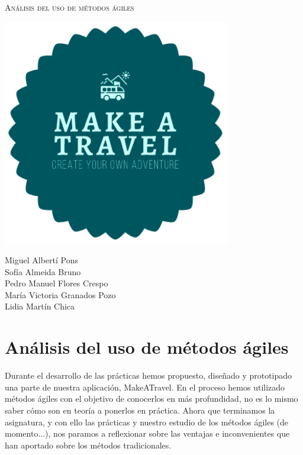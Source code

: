 \documentclass[11pt]{article}
\begin{document}
\begin{titlepage}
\centering
\vspace{4.5cm}
{\scshape\LARGE Análisis del uso de métodos ágiles\par}
\vspace{1.5cm}

\includegraphics[width=10cm] {Logo}

\vspace{3cm}
{\scshape\large \par}
\vspace{1cm}

{Miguel Albertí Pons\\
Sofía Almeida Bruno\\
Pedro Manuel Flores Crespo\\
María Victoria Granados Pozo\\
Lidia Martín Chica
\par}

\end{titlepage}

\newpage
\section{Análisis del uso de métodos ágiles}
Durante el desarrollo de las prácticas hemos propuesto, diseñado y prototipado una parte de nuestra aplicación, MakeATravel. En el proceso hemos utilizado métodos ágiles con el objetivo de conocerlos en más profundidad, no es lo mismo saber cómo son en teoría a ponerlos en práctica. Ahora que terminamos la asignatura, y con ello las prácticas y nuestro estudio de los métodos ágiles (de momento...), nos paramos a reflexionar sobre las ventajas e inconvenientes que han aportado sobre los métodos tradicionales.
\end{document}
